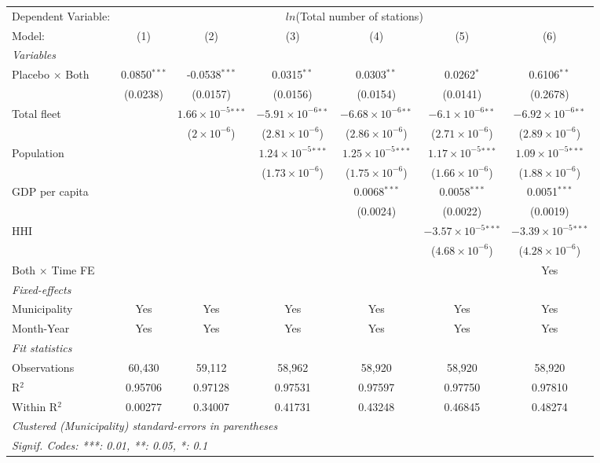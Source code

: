 \documentclass[
]{article}
\begin{document}
\begin{tabular}{lcccccc}
\tabularnewline\midrule\midrule
Dependent Variable:&\multicolumn{6}{c}{$ln$(Total number of stations)}\\
Model:&(1) & (2) & (3) & (4) & (5) & (6)\\
\midrule \emph{Variables}&   &   &   &   &   &  \\
Placebo $\times $ Both & 0.0850$^{***}$ & -0.0538$^{***}$ & 0.0315$^{**}$ & 0.0303$^{**}$ & 0.0262$^{*}$ & 0.6106$^{**}$\\
  &(0.0238) & (0.0157) & (0.0156) & (0.0154) & (0.0141) & (0.2678)\\
Total fleet &    & $1.66\times 10^{-5}$$^{***}$ & $-5.91\times 10^{-6}$$^{**}$ & $-6.68\times 10^{-6}$$^{**}$ & $-6.1\times 10^{-6}$$^{**}$ & $-6.92\times 10^{-6}$$^{**}$\\
  &   & ($2\times 10^{-6}$) & ($2.81\times 10^{-6}$) & ($2.86\times 10^{-6}$) & ($2.71\times 10^{-6}$) & ($2.89\times 10^{-6}$)\\
Population &    &    & $1.24\times 10^{-5}$$^{***}$ & $1.25\times 10^{-5}$$^{***}$ & $1.17\times 10^{-5}$$^{***}$ & $1.09\times 10^{-5}$$^{***}$\\
  &   &    & ($1.73\times 10^{-6}$) & ($1.75\times 10^{-6}$) & ($1.66\times 10^{-6}$) & ($1.88\times 10^{-6}$)\\
GDP per capita &    &    &    & 0.0068$^{***}$ & 0.0058$^{***}$ & 0.0051$^{***}$\\
  &   &    &    & (0.0024) & (0.0022) & (0.0019)\\
HHI &    &    &    &    & $-3.57\times 10^{-5}$$^{***}$ & $-3.39\times 10^{-5}$$^{***}$\\
  &   &    &    &    & ($4.68\times 10^{-6}$) & ($4.28\times 10^{-6}$)\\
Both $\times$ Time FE &  &  &  &  &  & Yes\\
\midrule \emph{Fixed-effects}&   &   &   &   &   &  \\
Municipality & Yes & Yes & Yes & Yes & Yes & Yes\\
Month-Year & Yes & Yes & Yes & Yes & Yes & Yes\\
\midrule \emph{Fit statistics}&  & & & & & \\
Observations & 60,430&59,112&58,962&58,920&58,920&58,920\\
R$^2$ & 0.95706&0.97128&0.97531&0.97597&0.97750&0.97810\\
Within R$^2$ & 0.00277&0.34007&0.41731&0.43248&0.46845&0.48274\\
\midrule\midrule\multicolumn{7}{l}{\emph{Clustered (Municipality) standard-errors in parentheses}}\\
\multicolumn{7}{l}{\emph{Signif. Codes: ***: 0.01, **: 0.05, *: 0.1}}\\
\end{tabular}
\end{document}
